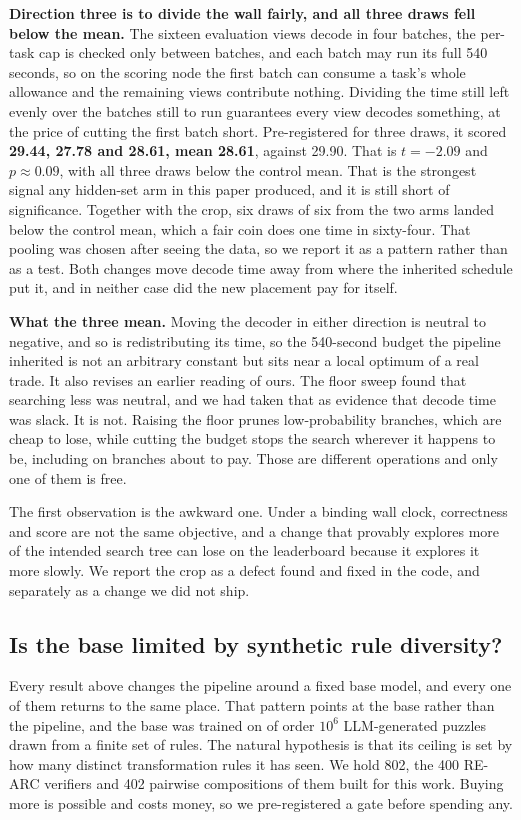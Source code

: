 \documentclass[11pt]{article}
\begin{document}
\textbf{Direction three is to divide the wall fairly, and all three draws fell below the mean.} The sixteen
evaluation views decode in four batches, the per-task cap is checked only between batches, and each
batch may run its full 540 seconds, so on the scoring node the first batch can consume a task's whole
allowance and the remaining views contribute nothing. Dividing the time still left evenly over the
batches still to run guarantees every view decodes something, at the price of cutting the first batch
short. Pre-registered for three draws, it scored \textbf{29.44, 27.78 and 28.61, mean 28.61}, against
29.90. That is $t=-2.09$ and $p\approx0.09$, with all three draws below the control mean. That is the strongest
signal any hidden-set arm in this paper produced, and it is still short of significance. Together with
the crop, six draws of six from the two arms landed below the control mean, which a fair coin does one
time in sixty-four. That pooling was chosen after seeing the data, so we report it as a pattern rather
than as a test. Both changes move decode time away from where the inherited schedule put it, and in
neither case did the new placement pay for itself.

\textbf{What the three mean.} Moving the decoder in either direction is neutral to negative, and so is
redistributing its time, so the 540-second budget the pipeline inherited is not an arbitrary constant
but sits near a local optimum of a real trade. It also revises an earlier reading of ours. The floor sweep found that searching
less was neutral, and we had taken that as evidence that decode time was slack. It is not. Raising
the floor prunes low-probability branches, which are cheap to lose, while cutting the budget stops the
search wherever it happens to be, including on branches about to pay. Those are different
operations and only one of them is free.

The first observation is the awkward one. Under a binding wall clock, correctness and score are
not the same objective, and a change that provably explores more of the intended search tree can lose
on the leaderboard because it explores it more slowly. We report the crop as a defect found and fixed
in the code, and separately as a change we did not ship.

\subsection{Is the base limited by synthetic rule diversity?}
\label{sec:rulediversity}
Every result above changes the pipeline around a fixed base model, and every one of them returns to
the same place. That pattern points at the base rather than the pipeline, and the base was trained on
of order $10^6$ LLM-generated puzzles drawn from a finite set of rules. The natural hypothesis is that
its ceiling is set by how many distinct transformation rules it has seen. We hold 802, the 400 RE-ARC
verifiers and 402 pairwise compositions of them built for this work. Buying more is possible and costs
money, so we pre-registered a gate before spending any.
\end{document}
